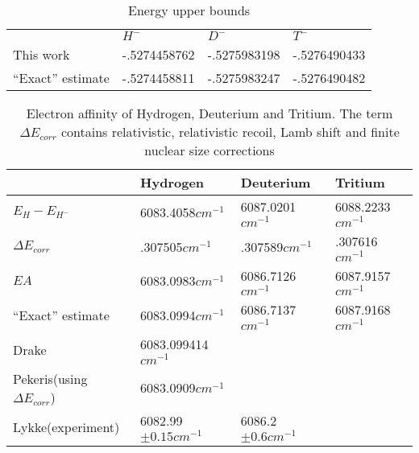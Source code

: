 \documentclass[12pt,thmsa]{article}
\begin{document}
\newpage

\begin{table}[t] \centering%
\begin{tabular}{llll}
\hline\hline
& $H^{-}$ & $D^{-}$ & $T^{-}$ \\ 
This work & -.5274458762 & -.5275983198 & -.5276490433 \\ 
``Exact'' estimate & -.5274458811 & -.5275983247 & -.5276490482 \\ 
\hline\hline
\end{tabular}
\caption{Energy upper bounds \label{boundstab}}%
\end{table}%
\pagebreak \pagebreak \bigskip \vspace*{3in}\bigskip \bigskip \bigskip
\vspace*{4in}%
\begin{table}[t] \centering%
\begin{tabular}{llll}
\hline\hline
& Hydrogen & Deuterium & Tritium \\ \hline
$E_H-E_{H^{-}}$ & 6083.4058$cm^{-1}$ & 6087.0201$cm^{-1}$ & 6088.2233$%
cm^{-1} $ \\ 
$\Delta E_{corr}$ & .307505$cm^{-1}$ & .307589$cm^{-1}$ & .307616$cm^{-1}$
\\ 
$EA$ & 6083.0983$cm^{-1}$ & 6086.7126$cm^{-1}$ & 6087.9157$cm^{-1}$ \\ 
``Exact'' estimate & 6083.0994$cm^{-1}$ & 6086.7137$cm^{-1}$ & 6087.9168$%
cm^{-1}$ \\ \hline
Drake\cite{Drake88} & 6083.099414$cm^{-1}$ &  &  \\ 
Pekeris\cite{Pekeris62}(using $\Delta E_{corr}$) & 6083.0909$cm^{-1}$ &  & 
\\ 
Lykke\cite{Lykke91}(experiment) & 6082.99$\pm 0.15cm^{-1}$ & 6086.2$\pm
0.6cm^{-1}$ &  \\ \hline\hline
\end{tabular}
\caption{Electron affinity of Hydrogen, Deuterium and Tritium. The  term $ \Delta E_{corr} $
contains relativistic, relativistic recoil, Lamb shift and finite nuclear size corrections   \label{EAtab}}%
\end{table}%
\end{document}
